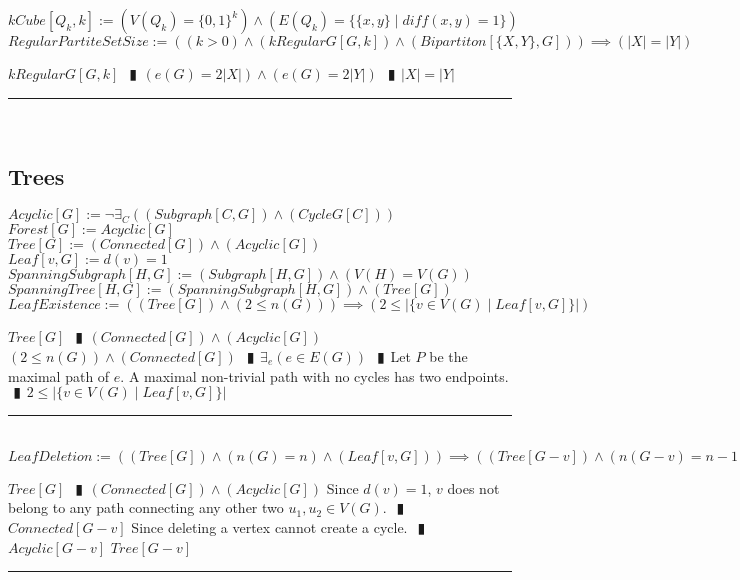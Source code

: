 \documentclass{book}
\newcommand{\abr}{:=}
\newcommand{\pipe}{$\phantom{(}\vrectangleblack\phantom{)}$}
\newcommand{\pr}[1]{\left(#1\right)}
\newcommand{\st}{\mathbin{|}}
\newcommand{\utup}[1]{\{#1\}}
\begin{document}
$kCube[Q_k, k] \abr \pr{V(Q_k) = \{0, 1\}^k} \land \pr{E(Q_k) = \{\utup{x, y} \st diff(x, y) = 1\}}$ \\

$RegularPartiteSetSize \abr \pr{(k > 0) \land (kRegularG[G, k]) \land (Bipartiton[\{X, Y\}, G])} \implies (|X| = |Y|)$
\begin{enumerate}
  \lit $kRegularG[G, k]$ \pipe $\pr{e(G) = 2 |X|} \land \pr{e(G) = 2 |Y|}$ \pipe $|X| = |Y|$
\end{enumerate} \vspace{.75mm} \hrule \vspace{.75mm} \ \\ 



\subsection{Trees}
$Acyclic[G] \abr \lnot \exists_{C}\pr{(Subgraph[C, G]) \land (CycleG[C])}$ \\
$Forest[G] \abr Acyclic[G]$ \\
$Tree[G] \abr (Connected[G]) \land (Acyclic[G])$ \\
$Leaf[v, G] \abr d(v) = 1$ \\
$SpanningSubgraph[H, G] \abr (Subgraph[H, G]) \land \pr{V(H) = V(G)}$ \\
$SpanningTree[H, G] \abr (SpanningSubgraph[H, G]) \land (Tree[G])$ \\

$LeafExistence \abr \pr{(Tree[G]) \land \pr{2 \leq n(G)}} \implies \pr{2 \leq |\{v \in V(G) \st Leaf[v, G]\}|}$
\begin{enumerate}
  \lit $Tree[G]$ \pipe $(Connected[G]) \land (Acyclic[G])$
  \lit $\pr{2 \leq n(G)} \land (Connected[G])$ \pipe $\exists_{e}\pr{e \in E(G)}$ \pipe Let $P$ be the maximal path of $e$.
  \lit A maximal non-trivial path with no cycles has two endpoints. \pipe $2 \leq |\{v \in V(G) \st Leaf[v, G]\}|$
\end{enumerate} \vspace{.75mm} \hrule \vspace{.75mm} \ \\ 

$LeafDeletion \abr \pr{(Tree[G]) \land \pr{n(G) = n} \land (Leaf[v, G])} \implies \pr{(Tree[G - v]) \land \pr{n(G - v) = n - 1}}$
\begin{enumerate}
  \lit $Tree[G]$ \pipe $(Connected[G]) \land (Acyclic[G])$
  \lit Since $d(v) = 1$, $v$ does not belong to any path connecting any other two $u_1, u_2 \in V(G)$. \pipe $Connected[G - v]$
  \lit Since deleting a vertex cannot create a cycle. \pipe $Acyclic[G - v]$
  \lit $Tree[G - v]$
\end{enumerate} \vspace{.75mm} \hrule \vspace{.75mm} \ \\ 
\end{document}
